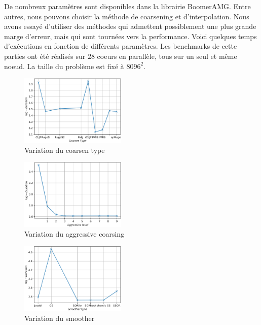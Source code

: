 \documentclass[10pt,twocolumn,letterpaper]{article}
\begin{document}
De nombreux paramètres sont disponibles dans la librairie BoomerAMG. Entre
autres, nous pouvons choisir la méthode de coarsening et d'interpolation.
Nous avons essayé d'utiliser des méthodes qui admettent possiblement une plus
grande marge d'erreur, mais qui sont tournées vers la performance.
Voici quelques temps d'exécutions en fonction de différents paramètres. Les
benchmarks de cette parties ont été réalisés sur $28$ coeurs en parallèle, tous
sur un seul et même noeud. La taille du problème est fixé à $8096^2$.

\begin{figure}[H]
  \caption{Variation du coarsen type}
  \includegraphics[width=0.45\textwidth]{fig/strong_coarsen_type.png}
\end{figure}

\begin{figure}[H]
    \centering
    \caption{Variation du aggressive coarsing}
    \includegraphics[width=0.45\textwidth]{fig/strong_agg_level.png}
  \end{figure}

  \begin{figure}[H]
    \centering
    \caption{Variation du smoother}
    \includegraphics[width=0.45\textwidth]{fig/strong_smoother.png}
  \end{figure}
\end{document}
